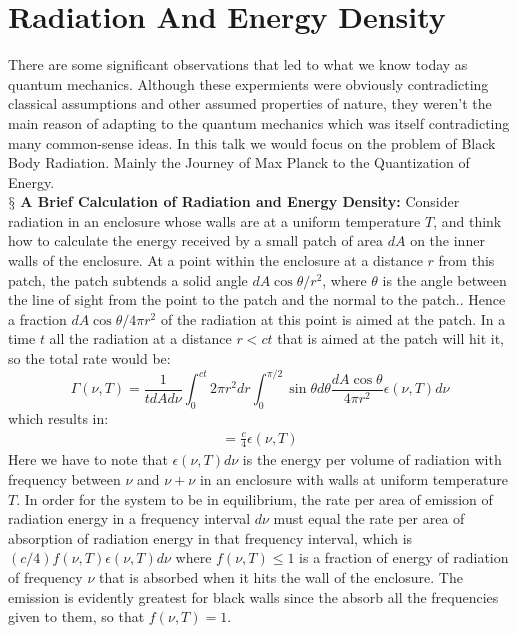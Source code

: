 \documentclass[9pt,a4paper, twocolumn]{article}
\newcommand{\newpoint}[1]{\ \\ \indent$\mathsection$ \textbf{#1}}
\begin{document}
    \section{Radiation And Energy Density}
        There are some significant observations that led to what we know today as quantum mechanics. Although these expermients were obviously contradicting classical assumptions and other assumed properties of nature, they weren't the main reason of adapting to the quantum mechanics which was itself contradicting many common-sense ideas. In this talk we would focus on the problem of Black Body Radiation. Mainly the Journey of Max Planck to the Quantization of Energy.
        \newpoint{A Brief Calculation of Radiation and Energy Density:}  Consider radiation in an enclosure whose walls are at a uniform temperature $T$, and think how to calculate the energy received by a small patch of area $dA$ on the inner walls of the enclosure. At a point within the enclosure at a distance $r$ from this patch, the patch subtends a solid angle $dA\cos\theta/r^2$, where $\theta$ is the angle between the line of sight from the point to the patch and the normal to the patch.. Hence a fraction $dA\cos\theta/4\pi r^2$ of the radiation at this point is aimed at the patch. In a time $t$ all the radiation at a distance $r<ct$ that is aimed at the patch will hit it, so the total rate would be:
        \begin{equation}
            \Gamma(\nu, T) = \frac{1}{tdA d\nu} \int_0^{ct}2\pi r^2 dr\int_0^{\pi/2} \sin\theta d\theta \frac{dA\cos\theta}{4\pi r^2}\epsilon (\nu, T) d\nu 
        \end{equation}
        which results in:
        \begin{align*}
            = \frac c4 \epsilon(\nu, T)
        \end{align*}
        Here we have to note that $\epsilon(\nu, T)d\nu$ is the energy per volume of radiation with frequency between $\nu$ and $\nu + \nu$ in an enclosure with walls at uniform temperature $T$. In order for the system to be in equilibrium, the rate per area of emission of radiation energy in a frequency interval $d\nu$ must equal the rate per area of absorption of radiation energy in that frequency interval, which is $(c/4)f(\nu, T)\epsilon(\nu, T)d\nu$ where $f(\nu, T)\leq 1$ is a fraction of energy of radiation of frequency $\nu$ that is absorbed when it hits the wall of the enclosure. The emission is evidently greatest for black walls since the absorb all the frequencies given to them, so that $f(\nu, T) = 1$.
        \\
\end{document}
